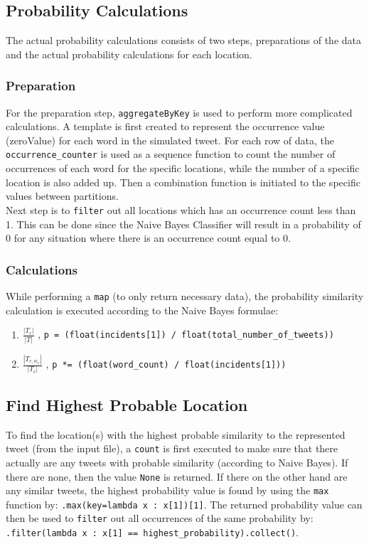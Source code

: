 \documentclass{article}
\begin{document}
\subsection*{Probability Calculations}
The actual probability calculations consists of two steps, preparations of the data and the actual probability calculations for each location.


\subsubsection*{Preparation}
For the preparation step, \texttt{aggregateByKey} is used to perform more complicated calculations. A template is first created to represent the occurrence value (zeroValue) for each word in the simulated tweet. For each row of data, the \texttt{occurrence\_counter} is used as a sequence function to count the number of occurrences of each word for the specific locations, while the number of a specific location is also added up. Then a combination function is initiated to the specific values between partitions.\\

\noindent Next step is to \texttt{filter} out all locations which has an occurrence count less than 1. This can be done since the Naive Bayes Classifier will result in a probability of 0 for any situation where there is an occurrence count equal to 0.


\subsubsection*{Calculations}
While performing a \texttt{map} (to only return necessary data), the probability similarity calculation is executed according to the Naive Bayes formulae:

\begin{enumerate}
    \item $\frac{|T_{c}|}{|T|}$ , \texttt{p = (float(incidents[1]) / float(total\_number\_of\_tweets))}
    \item $\frac{|T_{c, w_{x}}|}{|T_{c}|}$ , \texttt{p *= (float(word\_count) / float(incidents[1]))}
\end{enumerate}


\subsection*{Find Highest Probable Location}
To find the location(s) with the highest probable similarity to the represented tweet (from the input file), a \texttt{count} is first executed to make sure that there actually are any tweets with probable similarity (according to Naive Bayes). If there are none, then the value \texttt{None} is returned. If there on the other hand are any similar tweets, the highest probability value is found by using the \texttt{max} function by: \texttt{.max(key=lambda x : x[1])[1]}. The returned probability value can then be used to \texttt{filter} out all occurrences of the same probability by: \texttt{.filter(lambda x : x[1] == highest\_probability).collect()}.
\end{document}
